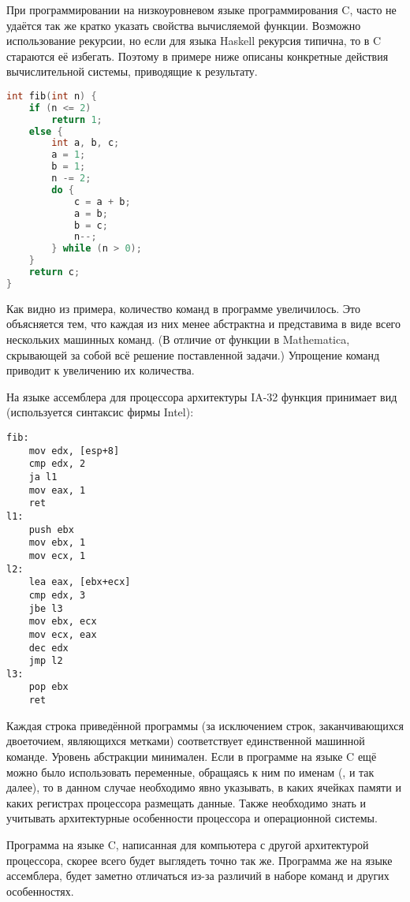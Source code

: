 При программировании на низкоуровневом языке программирования C, часто
не удаётся так же кратко указать свойства вычисляемой функции.
Возможно использование рекурсии, но если для языка Haskell рекурсия
типична, то в C стараются её избегать. Поэтому в примере ниже описаны
конкретные действия вычислительной системы, приводящие к результату.

\begin{lstlisting}[language=C]
int fib(int n) {
    if (n <= 2)
        return 1;
    else {
        int a, b, c;
        a = 1;
        b = 1;
        n -= 2;
        do {
            c = a + b;
            a = b;
            b = c;
            n--;
        } while (n > 0);
    }
    return c;
}
\end{lstlisting}

Как видно из примера, количество команд в программе увеличилось. Это
объясняется тем, что каждая из них менее абстрактна и представима в
виде всего нескольких машинных команд. (В отличие от функции
 в Mathematica, скрывающей за собой всё решение
поставленной задачи.) Упрощение команд приводит к увеличению их
количества.

На языке ассемблера для процессора архитектуры IA-32 функция принимает
вид (используется синтаксис фирмы Intel):

\begin{lstlisting}[language={[x86masm]Assembler}]
fib:
    mov edx, [esp+8]
    cmp edx, 2
    ja l1
    mov eax, 1
    ret
l1:
    push ebx
    mov ebx, 1
    mov ecx, 1
l2:
    lea eax, [ebx+ecx]
    cmp edx, 3
    jbe l3
    mov ebx, ecx
    mov ecx, eax
    dec edx
    jmp l2
l3:
    pop ebx
    ret
\end{lstlisting}

Каждая строка приведённой программы (за исключением строк,
заканчивающихся двоеточием, являющихся метками) соответствует
единственной машинной команде. Уровень абстракции минимален. Если в
программе на языке C ещё можно было использовать переменные, обращаясь
к ним по именам (,  и так далее), то в данном случае
необходимо явно указывать, в каких ячейках памяти и каких регистрах
процессора размещать данные. Также необходимо знать и учитывать
архитектурные особенности процессора и операционной системы.

Программа на языке C, написанная для компьютера с другой архитектурой
процессора, скорее всего будет выглядеть точно так же. Программа же на
языке ассемблера, будет заметно отличаться из-за различий в наборе
команд и других особенностях.

